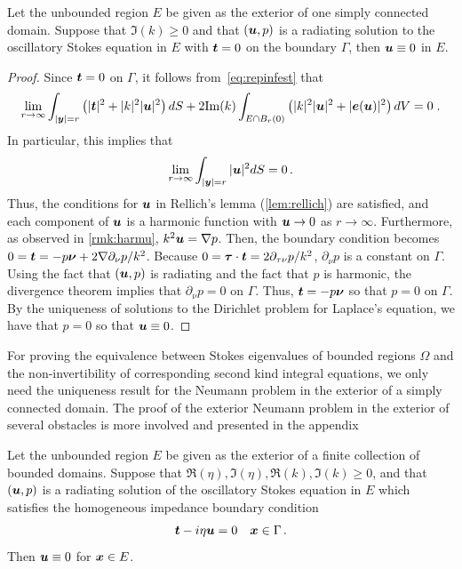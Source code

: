 \begin{thrm}
  Let the unbounded region $E$ be given as the exterior
  of one simply connected domain.
  Suppose that $\Im(k)\geq 0$ and 
  that $({\boldsymbol u},p)$ is a radiating solution to the oscillatory Stokes
  equation in $E$ with ${\boldsymbol t} = 0$ on the boundary $\Gamma$, then
  ${\boldsymbol u} \equiv 0$ in $E$.
\end{thrm}

\begin{proof}
Since ${\boldsymbol t} = 0$ on $\Gamma$, it follows
from~\cref{eq:repinfest} that
\begin{equation}
\lim_{r\to\infty}
\int_{|{\boldsymbol y}|=r} \left( |{\boldsymbol t}|^2 + |k|^2 |{\boldsymbol u}|^2 \right) dS +
2 {\textrm{\textup{Im}}}(k) \int_{E \cap B_{r}(0)} \left(|k|^2 |{\boldsymbol u}|^2 + |{\boldsymbol e}({\boldsymbol u})|^2 \right)
dV = 0 \; . \nonumber
\end{equation} 
In particular, this implies that
\begin{equation}
\lim_{r\to\infty} \int_{|{\boldsymbol y}|=r} |{\boldsymbol u}|^2 dS = 0 \, . \nonumber
\end{equation}
Thus, the conditions for ${\boldsymbol u}$ in Rellich's lemma (\cref{lem:rellich})
are satisfied, and each component of ${\boldsymbol u}$ is a harmonic function
with ${\boldsymbol u} \to 0$ as $r \to \infty$. Furthermore, as observed
in \cref{rmk:harmu}, $k^2 {\boldsymbol u} = \nabla p$. Then, the boundary
condition becomes $0 = {\boldsymbol t} = -p {\boldsymbol \nu} + 2 \nabla \partial_\nu p/k^2$.
Because $0 = {\boldsymbol \tau} \cdot {\boldsymbol t} = 2\partial_{\tau\nu} p/k^2$,
$\partial_\nu p $ is a constant on $\Gamma$. Using the
fact that $({\boldsymbol u},p)$ is radiating and the fact that $p$ is harmonic,
the divergence theorem implies that $\partial_\nu p=0$ on $\Gamma$.
Thus, ${\boldsymbol t} = -p{\boldsymbol \nu}$ so that $p = 0$ on $\Gamma$. By the uniqueness
of solutions to the Dirichlet problem for Laplace's equation,
we have that $p=0$ so that ${\boldsymbol u} \equiv 0$.
\end{proof}

\begin{remark}
For proving the equivalence between Stokes eigenvalues
of bounded regions $\Omega$ and the non-invertibility
of corresponding second kind integral equations, we only
need the uniqueness result for the Neumann problem in the 
exterior of a simply connected domain. 
The proof of the exterior Neumann problem in the exterior of several
obstacles is more involved and presented in the 
appendix~\cite{app:neuuniqueness}
\end{remark}

\begin{thrm}
  Let the unbounded region $E$ be given as the exterior
  of a finite collection of bounded domains.
  Suppose that $\Re(\eta),\Im(\eta),\Re(k),\Im(k) \geq 0$, and that
  $({\boldsymbol u},p)$ is a radiating solution of the
  oscillatory Stokes equation in $E$ which satisfies
  the homogeneous impedance boundary condition
  \begin{equation}
{\boldsymbol t} - i \eta {\boldsymbol u} = 0 \quad {\boldsymbol x} \in \Gamma \, . \nonumber
\end{equation}
Then ${\boldsymbol u} \equiv 0$ for ${\boldsymbol x} \in E$.
\end{thrm}

